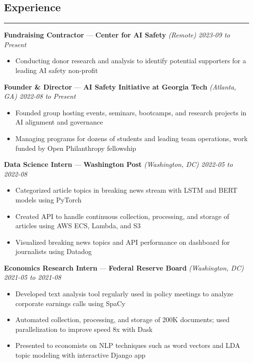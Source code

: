 \documentclass[10pt]{article}
\newcommand{\resumeHeading}[1]{
    \subsection*{#1}
    \hrule
    \vspace*{5pt}
}
\newcommand{\resumeSubHeading}[5]{
    \vspace*{5pt}
    \textbf{#1} — \textbf{#2} \textsl{(#3) \hfill #4 to #5}
}
\begin{document}

\resumeHeading{Experience \vspace{-2.5pt}}

\resumeSubHeading
    {Fundraising Contractor}
    {Center for AI Safety}
    {Remote}
    {2023-09}
    {Present}
\begin{itemize}
    \item Conducting donor research and analysis to identify potential supporters for a leading AI safety non-profit
\end{itemize}

\resumeSubHeading
    {Founder \& Director}
    {AI Safety Initiative at Georgia Tech}
    {Atlanta, GA}
    {2022-08}
    {Present}
\begin{itemize}
    \item Founded group hosting events, seminars, bootcamps, and research projects in AI alignment and governance
    \item Managing programs for dozens of students and leading team operations, work funded by Open Philanthropy fellowship
\end{itemize}


\resumeSubHeading
    {Data Science Intern}
    {Washington Post}
    {Washington, DC}
    {2022-05}
    {2022-08}
\begin{itemize}
    \item Categorized article topics in breaking news stream with LSTM and BERT models using PyTorch
    \item Created API to handle continuous collection, processing, and storage of articles using AWS ECS, Lambda, and S3
    \item Visualized breaking news topics and API performance on dashboard for journalists using Datadog
\end{itemize}

\resumeSubHeading
    {Economics Research Intern}
    {Federal Reserve Board}
    {Washington, DC}
    {2021-05}
    {2021-08}
\begin{itemize}
    \item Developed text analysis tool regularly used in policy meetings to analyze corporate earnings calls using SpaCy
    \item Automated collection, processing, and storage of 200K documents; used parallelization to improve speed 8x with Dask
    \item Presented to economists on NLP techniques such as word vectors and LDA topic modeling with interactive Django app
\end{itemize}
\end{document}
